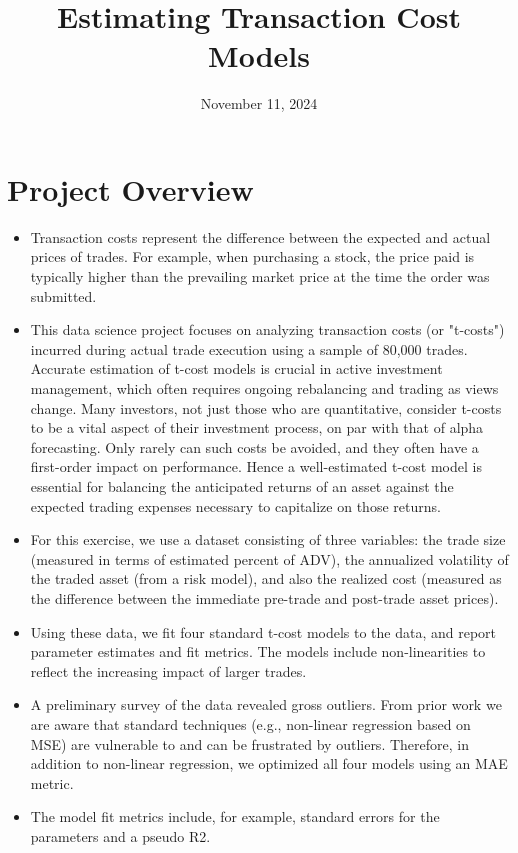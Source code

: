 \documentclass[12pt]{article}
\title{Estimating Transaction Cost Models}
\date{November 11, 2024}
\begin{document}
\maketitle

\section{Project Overview}

\begin{itemize}
    
\item Transaction costs represent the difference between the expected and actual prices of trades. For example, when purchasing a stock, the price paid is typically higher than the prevailing market price at the time the order was submitted.

\item This data science project focuses on analyzing transaction costs (or "t-costs") incurred during actual trade execution using a sample of 80,000 trades.  Accurate estimation of t-cost models is crucial in active investment management, which often requires ongoing rebalancing and trading as views change.    Many investors, not just those who are quantitative, consider t-costs to be a vital aspect of their investment process, on par with that of alpha forecasting.  Only rarely can such costs be avoided, and they often have a first-order impact on performance.  Hence a well-estimated t-cost model is essential for balancing the anticipated returns of an asset against the expected trading expenses necessary to capitalize on those returns.

\item For this exercise, we use a dataset consisting of three variables: the trade size (measured in terms of estimated percent of ADV), the annualized volatility of the traded asset (from a risk model), and also the realized cost (measured as the difference between the immediate pre-trade and post-trade asset prices). 

\item Using these data, we fit four standard t-cost models to the data, and report parameter estimates and fit metrics. The models include non-linearities to reflect the increasing impact of larger trades. 

\item A preliminary survey of the data revealed gross outliers.  From prior work we are aware that standard techniques (e.g., non-linear regression based on MSE) are vulnerable to and can be frustrated by outliers.  Therefore, in addition to non-linear regression, we optimized all four models using an MAE metric.

\item   The model fit metrics include, for example, standard errors for the parameters and a pseudo R2.   

\end{itemize}
\end{document}
